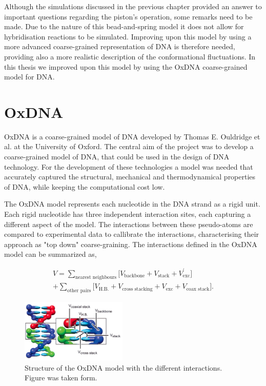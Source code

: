 \vspace{1cm}
\noindent Although the simulations discussed in the previous chapter provided an answer
to important questions regarding the piston's operation, some remarks need to be made.
Due
to the nature of this bead-and-spring model it does not allow for hybridisation reactions
to be simulated. Improving upon this model by using a more advanced coarse-grained
representation of DNA is therefore needed, providing also a more realistic description of
the conformational fluctuations. In this thesis we improved upon this model by using the
OxDNA coarse-grained model for DNA.\\


\section{OxDNA}


OxDNA is a coarse-grained model of DNA developed by Thomas E. Ouldridge et al. at the
University of Oxford.\cite{thomas2011a}\cite{Ouldridge2010} The central aim of the
project was to develop a coarse-grained model of DNA, that could be used in the design of
DNA technology. For the development of these technologies a model was needed that
accurately captured the structural, mechanical
and thermodynamical properties of DNA, while keeping the computational cost low.

The OxDNA model represents each nucleotide in the DNA strand as a rigid unit. Each rigid
nucleotide has three independent interaction sites, each capturing a different aspect of
the model. The interactions between these pseudo-atoms are compared to experimental
data to callibrate the interactions, characterising their approach as "top down"
coarse-graining. The interactions defined in the OxDNA model can be summarized as,

\begin{equation}
  \begin{aligned}
    V = \sum_{\text{nearest neighbours}} \bigg[ V_{\text{backbone}} + V_{\text{stack}} +
    V^{'}_{\text{exc}}\bigg]\\
    + \sum_{\text{other pairs}} \bigg[V_{\text{H.B.}} + V_{\text{cross stacking}} +
    V_{\text{exc}} + V_{\text{coax stack}}\bigg].
  \end{aligned}
\end{equation}

\begin{figure}
  \begin{center}
    \includegraphics[width=0.45\textwidth]{Figures/oxDNA_model.png}
  \end{center}
  \caption{Structure of the OxDNA model with the different interactions.
  Figure was taken form. \cite{Ouldridge2010}}
\end{figure}

